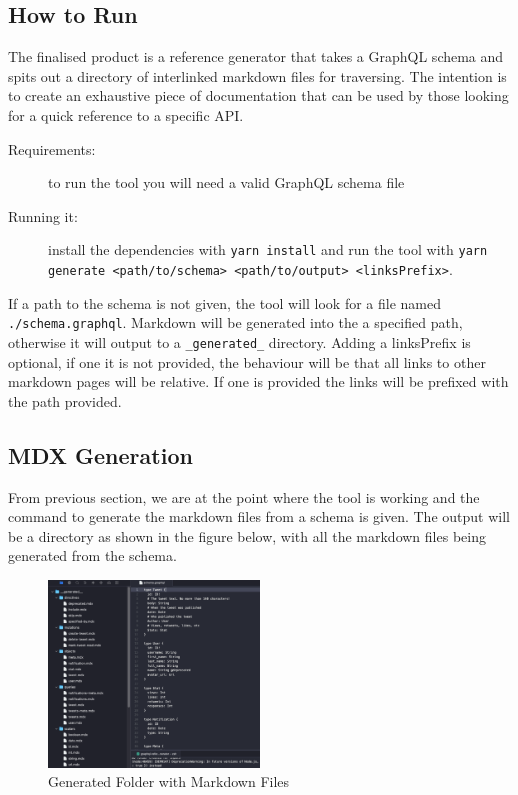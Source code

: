 \subsection{How to Run}
\label{ss:how-to-run}
The finalised product is a reference generator that takes a GraphQL schema and
spits out a directory of interlinked markdown files for traversing. The
intention is to create an exhaustive piece of documentation that can be used by
those looking for a quick reference to a specific API.

\begin{description}
  \item [Requirements:] to run the tool you will need a valid GraphQL schema
  file
  \item [Running it:] install the dependencies with \texttt{yarn install} and
  run the tool with \texttt{yarn generate <path/to/schema> <path/to/output>
  <linksPrefix>}.
\end{description}

If a path to the schema is not given, the tool will look for a file named
\texttt{./schema.graphql}. Markdown will be generated into the a specified path,
otherwise it will output to a \texttt{\_generated\_} directory. Adding a
linksPrefix is optional, if one it is not provided, the behaviour will be that
all links to other markdown pages will be relative. If one is provided the links
will be prefixed with the path provided.

\subsection{MDX Generation}
\label{ss:mdx-generation}

From previous section, we are at the point where the tool is working and the
command to generate the markdown files from a schema is given. The output will
be a directory as shown in the figure below, with all the markdown files being
generated from the schema.

\begin{figure}[H]
  \centering
  \includegraphics[width=0.5\textwidth]{figures/generate}
  \caption{Generated Folder with Markdown Files}
  \label{f:generate}
\end{figure}

